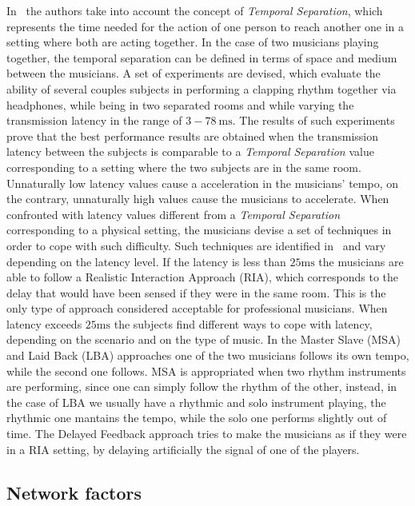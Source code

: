 In~\cite{Chafe1,Chafe2,Chafe3} the authors take into account the concept of \textit{Temporal Separation}, which represents the time needed for the action of one person to reach another one in a setting where both are acting together. In the case of two musicians playing together, the temporal separation can be defined in terms of space and medium between the musicians. A set of experiments are devised, which evaluate the ability of several couples subjects in performing a clapping rhythm together via headphones, while being in two separated rooms and while varying the transmission latency in the range of $3-78~\mathrm{ms}$. The results of such experiments prove that the best performance results are obtained when the transmission latency between the subjects is comparable to a \textit{Temporal Separation} value corresponding to a setting where the two subjects are in the same room. Unnaturally low latency values cause a acceleration in the musicians' tempo, on the contrary, unnaturally high values cause the musicians to accelerate.
When confronted with latency values different from a \textit{Temporal Separation} corresponding to a physical setting, the musicians devise a set of techniques in order to cope with such difficulty. Such techniques are identified in~\cite{Carot07networkmusic} and vary depending on the latency level. If the latency is less than $25\mathrm{ms}$ the musicians are able to follow a Realistic Interaction Approach (RIA), which corresponds to the delay that would have been sensed if they were in the same room. This is the only type of approach considered acceptable for professional musicians. When latency exceeds $25\mathrm{ms}$ the subjects find different ways to cope with latency, depending on the scenario and on the type of music. In the Master Slave (MSA) and Laid Back (LBA) approaches one of the two musicians follows its own tempo, while the second one follows. MSA is appropriated when two rhythm instruments are performing, since one can simply follow the rhythm of the other, instead, in the case of LBA we usually have a rhythmic and solo instrument playing, the rhythmic one mantains the tempo, while the solo one performs slightly out of time. The Delayed Feedback approach tries to make the musicians as if they were in a RIA setting, by delaying artificially the signal of one of the players.

\subsection{Network factors}

